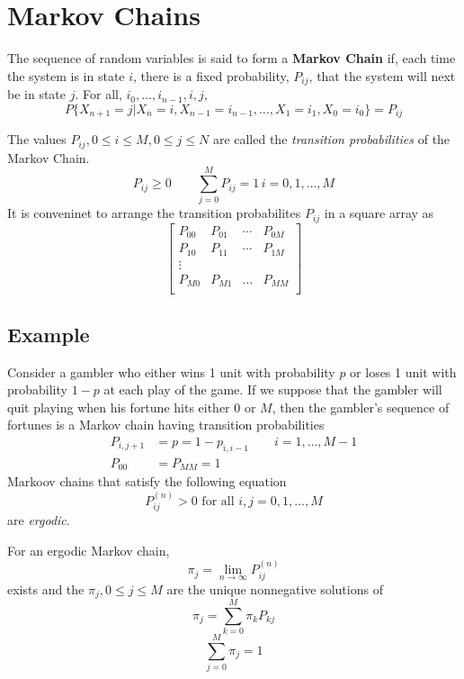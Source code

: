 \section{Markov Chains}
\begin{definition}
    The sequence of random variables is said to form a \textbf{Markov Chain} if, each time the system is in state $i$, there is a fixed probability, $P_{ij}$, that the system will next be in state $j$. For all, $i_0, \dots, i_{n- 1}, i, j$, \[P\{X_{n + 1} = j|X_n = i, X_{n-1} = i_{n-1}, \dots, X_1 = i_1, X_0 = i_0\} = P_{ij}\]
\end{definition}
The values $P_{ij}, 0\leq i\leq M, 0\leq j\leq N$ are called the \textit{transition probabilities} of the Markov Chain. 
\[P_{ij}\geq 0\qquad \sum^M_{j = 0} P_{ij} = 1\, i = 0,1,\dots, M\]
It is conveninet to arrange the transition probabilites $P_{ij}$ in a square array as 
\[\begin{bmatrix}
P_{00} & P_{01} & \cdots & P_{0M}\\
P_{10} & P_{11} & \cdots & P_{1M}\\
\vdots & & & \\
P_{M0} & P_{M1} & \ldots & P_{MM}\\
\end{bmatrix}\]
\subsection*{Example}
Consider a gambler who either wins 1 unit with probability $p$ or loses 1 unit with probability $1 - p$ at each play of the game. If we suppose that the gambler will quit playing when his fortune hits either 0 or $M$, then the gambler’s sequence of fortunes is a Markov chain having transition probabilities
\begin{equation*}
    \begin{split}
        P_{i, j+1} &= p = 1 - p_{i,i - 1}\qquad i = 1,\dots, M - 1\\
        P_{00} &= P_{MM} = 1
    \end{split}
\end{equation*}
Markoov chains that satisfy the following equation \[P^{(n)}_{ij} > 0 \text{ for all } i,j = 0,1,\dots, M\] are \textit{ergodic}.
\begin{theorem}
    For an ergodic Markov chain, \[\pi_j = \lim_{n\rightarrow\infty} P_{ij}^(n)\] exists and the $\pi_j, 0\leq j\leq M$ are the unique nonnegative solutions of \[\pi_j = \sum^M_{k = 0} \pi_k P_{kj}\] \[\sum^M_{j = 0} \pi_j = 1\]
\end{theorem}